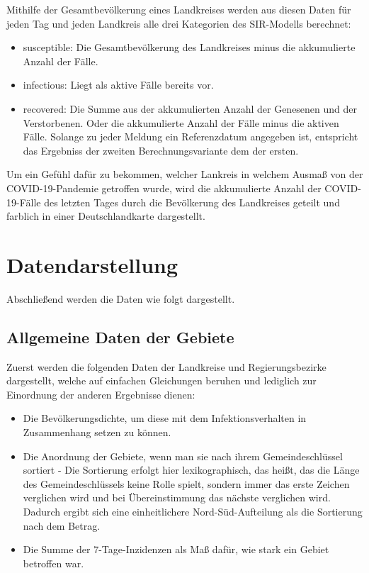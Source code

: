 Mithilfe der Gesamtbevölkerung eines Landkreises werden aus diesen Daten für jeden Tag und jeden Landkreis alle drei Kategorien des SIR-Modells berechnet:

\begin{itemize}
    \item \glqq{}susceptible\grqq{}: Die Gesamtbevölkerung des Landkreises minus die akkumulierte Anzahl der Fälle.
    \item \glqq{}infectious\grqq{}: Liegt als aktive Fälle bereits vor.
    \item \glqq{}recovered\grqq{}:
    Die Summe aus der akkumulierten Anzahl der Genesenen und der Verstorbenen. Oder die akkumulierte Anzahl der Fälle minus die aktiven Fälle. Solange zu jeder Meldung ein Referenzdatum angegeben ist, entspricht das Ergebniss der zweiten Berechnungsvariante dem der ersten.
\end{itemize}

Um ein Gefühl dafür zu bekommen, welcher Lankreis in welchem Ausmaß von der COVID-19-Pandemie getroffen wurde, wird die akkumulierte Anzahl der COVID-19-Fälle des letzten Tages durch die Bevölkerung des Landkreises geteilt und farblich in einer Deutschlandkarte dargestellt.
%
\section{Datendarstellung}
Abschließend werden die Daten wie folgt dargestellt.
\subsection{Allgemeine Daten der Gebiete}
Zuerst werden die folgenden Daten der Landkreise und Regierungsbezirke dargestellt, welche auf einfachen Gleichungen beruhen und lediglich zur Einordnung der anderen Ergebnisse dienen:
\begin{itemize}
    \item Die Bevölkerungsdichte, um diese mit dem Infektionsverhalten in Zusammenhang setzen zu können.
    \item Die Anordnung der Gebiete, wenn man sie nach ihrem Gemeindeschlüssel sortiert - Die Sortierung erfolgt hier lexikographisch, das heißt, das die Länge des Gemeindeschlüssels keine Rolle spielt, sondern immer das erste Zeichen verglichen wird und bei Übereinstimmung das nächste verglichen wird. Dadurch ergibt sich eine einheitlichere Nord-Süd-Aufteilung als die Sortierung nach dem Betrag.
    \item Die Summe der 7-Tage-Inzidenzen als Maß dafür, wie stark ein Gebiet betroffen war.
\end{itemize}
